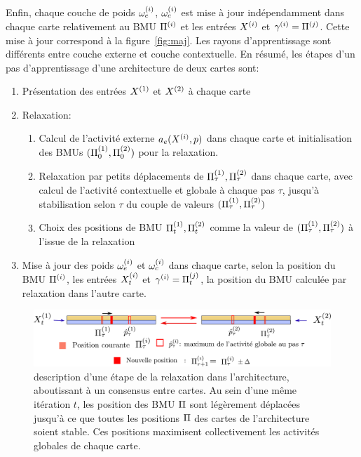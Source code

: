 Enfin, chaque couche de poids $\omega_{e}^{({i})}$, $\omega_c^{({i})}$ est mise à jour indépendamment dans chaque carte relativement au BMU $\Pi^{({i})}$ et les entrées $X^{({i})}$ et $\gamma^{({i})} = \Pi^{({j})}$. Cette mise à jour correspond à la figure~\ref{fig:maj}. Les rayons d'apprentissage sont différents entre couche externe et couche contextuelle.
En résumé, les étapes d'un pas d'apprentissage d'une architecture de deux cartes sont:
\begin{enumerate}
\item Présentation des entrées $X^{({1})}$ et $X^{({2})}$ à chaque carte
\item Relaxation:
\begin{enumerate}
\item Calcul de l'activité externe $a_e(X^{({i})},p)$ dans chaque carte et initialisation des BMUs $(\Pi^{({1})}_0,\Pi^{({2})}_0)$ pour la relaxation.
\item Relaxation par petits déplacements de $\Pi^{({1})}_\tau,\Pi^{({2})}_\tau$ dans chaque carte, avec calcul de l'activité contextuelle et globale à chaque pas $\tau$, jusqu'à stabilisation selon $\tau$ du couple de valeurs $(\Pi^{({1})}_\tau,\Pi^{({2})}_\tau)$
\item Choix des positions de BMU $\Pi^{({1})}_t,\Pi^{({2})}_t$ comme la valeur de $(\Pi^{({1})}_\tau,\Pi^{({2})}_\tau)$ à l'issue de la relaxation
\end{enumerate}
\item Mise à jour des poids $\omega_{e}^{({i})}$ et $\omega_{c}^{({i})}$ dans chaque carte, selon la position du BMU $\Pi^{({i})}$, les entrées $X^{({i})}_t$ et $\gamma^{({i})} = \Pi^{({j})}_t$, la position du BMU calculée par relaxation dans l'autre carte.
\end{enumerate}

\begin{figure}
\centering
\includegraphics[width=\textwidth]{relaxation_2maps.pdf}
\caption{description d'une étape de la relaxation dans l'architecture, aboutissant à un consensus entre cartes. Au sein d'une même itération $t$, les position des BMU $\Pi$ sont légèrement déplacées jusqu'à ce que toutes les positions $\Pi$ des cartes de l'architecture soient stable. Ces positions maximisent collectivement les activités globales de chaque carte. \label{fig:relax}}
\end{figure}


